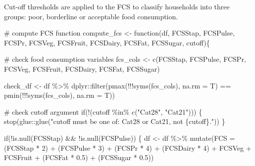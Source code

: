 \documentclass[
  letterpaper,
  DIV=11,
  numbers=noendperiod]{scrreprt}
\newenvironment{Shaded}{\begin{snugshade}}{\end{snugshade}}
\newcommand{\AttributeTok}[1]{\textcolor[rgb]{0.40,0.45,0.13}{#1}}
\newcommand{\CommentTok}[1]{\textcolor[rgb]{0.37,0.37,0.37}{#1}}
\newcommand{\ControlFlowTok}[1]{\textcolor[rgb]{0.00,0.23,0.31}{#1}}
\newcommand{\DecValTok}[1]{\textcolor[rgb]{0.68,0.00,0.00}{#1}}
\newcommand{\FloatTok}[1]{\textcolor[rgb]{0.68,0.00,0.00}{#1}}
\newcommand{\FunctionTok}[1]{\textcolor[rgb]{0.28,0.35,0.67}{#1}}
\newcommand{\NormalTok}[1]{\textcolor[rgb]{0.00,0.23,0.31}{#1}}
\newcommand{\OtherTok}[1]{\textcolor[rgb]{0.00,0.23,0.31}{#1}}
\newcommand{\SpecialCharTok}[1]{\textcolor[rgb]{0.37,0.37,0.37}{#1}}
\newcommand{\StringTok}[1]{\textcolor[rgb]{0.13,0.47,0.30}{#1}}
\begin{document}
Cut-off thresholds are applied to the FCS to classify households into
three groups: poor, borderline or acceptable food consumption.

\begin{Shaded}
\begin{Highlighting}[]
\CommentTok{\# compute FCS function}
\NormalTok{compute\_fcs }\OtherTok{\textless{}{-}} \ControlFlowTok{function}\NormalTok{(df,}
\NormalTok{                        FCSStap,}
\NormalTok{                        FCSPulse,}
\NormalTok{                        FCSPr,}
\NormalTok{                        FCSVeg,}
\NormalTok{                        FCSFruit,}
\NormalTok{                        FCSDairy,}
\NormalTok{                        FCSFat,}
\NormalTok{                        FCSSugar,}
\NormalTok{                        cutoff)\{}
  
  \CommentTok{\# check food consumption variables}
\NormalTok{  fcs\_cols }\OtherTok{\textless{}{-}} \FunctionTok{c}\NormalTok{(FCSStap, FCSPulse, FCSPr, FCSVeg, FCSFruit, FCSDairy, FCSFat, FCSSugar)}
  
\NormalTok{  check\_df }\OtherTok{\textless{}{-}}\NormalTok{ df }\SpecialCharTok{\%\textgreater{}\%}\NormalTok{ dplyr}\SpecialCharTok{::}\FunctionTok{filter}\NormalTok{(}\FunctionTok{pmax}\NormalTok{(}\SpecialCharTok{!!!}\FunctionTok{syms}\NormalTok{(fcs\_cols), }\AttributeTok{na.rm =}\NormalTok{ T) }\SpecialCharTok{==} \FunctionTok{pmin}\NormalTok{(}\SpecialCharTok{!!!}\FunctionTok{syms}\NormalTok{(fcs\_cols), }\AttributeTok{na.rm =}\NormalTok{ T))}
  
  \CommentTok{\# check cutoff argument}
  \ControlFlowTok{if}\NormalTok{(}\SpecialCharTok{!}\NormalTok{(cutoff }\SpecialCharTok{\%in\%} \FunctionTok{c}\NormalTok{(}\StringTok{"Cat28"}\NormalTok{, }\StringTok{"Cat21"}\NormalTok{))) \{}
    \FunctionTok{stop}\NormalTok{(glue}\SpecialCharTok{::}\FunctionTok{glue}\NormalTok{(}\StringTok{"\textasciigrave{}cutoff\textasciigrave{} must be one of: \textasciigrave{}Cat28\textasciigrave{} or \textasciigrave{}Cat21\textasciigrave{}, not \{cutoff\}."}\NormalTok{))}
\NormalTok{  \}}
  
  \ControlFlowTok{if}\NormalTok{(}\SpecialCharTok{!}\FunctionTok{is.null}\NormalTok{(FCSStap) }\SpecialCharTok{\&\&} \SpecialCharTok{!}\FunctionTok{is.null}\NormalTok{(FCSPulse)) \{}
\NormalTok{    df }\OtherTok{\textless{}{-}}\NormalTok{ df }\SpecialCharTok{\%\textgreater{}\%}
      \FunctionTok{mutate}\NormalTok{(}\AttributeTok{FCS =}\NormalTok{ (FCSStap }\SpecialCharTok{*} \DecValTok{2}\NormalTok{) }\SpecialCharTok{+}\NormalTok{ (FCSPulse }\SpecialCharTok{*} \DecValTok{3}\NormalTok{) }\SpecialCharTok{+}\NormalTok{ (FCSPr }\SpecialCharTok{*} \DecValTok{4}\NormalTok{) }\SpecialCharTok{+}
\NormalTok{               (FCSDairy }\SpecialCharTok{*} \DecValTok{4}\NormalTok{) }\SpecialCharTok{+}\NormalTok{ FCSVeg }\SpecialCharTok{+}\NormalTok{ FCSFruit }\SpecialCharTok{+}\NormalTok{ (FCSFat }\SpecialCharTok{*} \FloatTok{0.5}\NormalTok{) }\SpecialCharTok{+}
\NormalTok{               (FCSSugar }\SpecialCharTok{*} \FloatTok{0.5}\NormalTok{))}
    

\end{Highlighting}
\end{Shaded}
\end{document}
